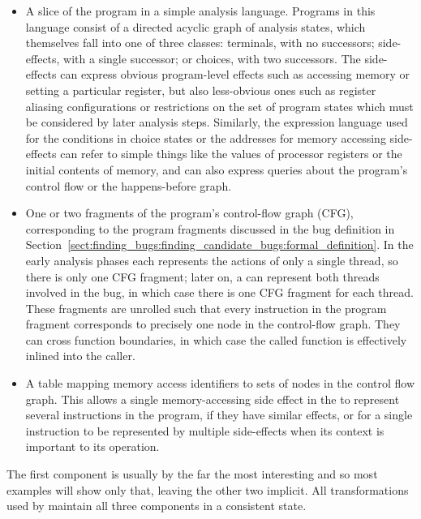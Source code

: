 \begin{itemize}
\item
  A slice of the program in a simple analysis language.  Programs in
  this language consist of a directed acyclic graph of analysis
  states, which themselves fall into one of three classes: terminals,
  with no successors; side-effects, with a single successor; or
  choices, with two successors.  The side-effects can express obvious
  program-level effects such as accessing memory or setting a
  particular register, but also less-obvious ones such as register
  aliasing configurations or restrictions on the set of program states
  which must be considered by later analysis steps.  Similarly, the
  expression language used for the conditions in choice states or the
  addresses for memory accessing side-effects can refer to simple
  things like the values of processor registers or the initial
  contents of memory, and can also express queries about the program's
  control flow or the happens-before graph.
\item
  One or two fragments of the program's control-flow graph (CFG),
  corresponding to the program fragments discussed in the bug
  definition in
  Section~\ref{sect:finding_bugs:finding_candidate_bugs:formal_definition}.
  In the early analysis phases each {\StateMachine} represents the
  actions of only a single thread, so there is only one CFG fragment;
  later on, a {\StateMachine} can represent both threads involved in
  the bug, in which case there is one CFG fragment for each thread.
  These fragments are unrolled such that every instruction in the
  program fragment corresponds to precisely one node in the
  control-flow graph.  They can cross function boundaries, in which
  case the called function is effectively inlined into the caller.
\item
  A table mapping memory access identifiers to sets of nodes in the
  control flow graph. This allows a single memory-accessing side
  effect in the \StateMachine{} to represent several instructions in
  the program, if they have similar effects, or for a single instruction to be represented by
  multiple side-effects when its context is important to its
  operation.
\end{itemize}

The first component is usually by the far the most interesting and so
most examples will show only that, leaving the other two implicit.
All transformations used by {\technique} maintain all three components
in a consistent state.

